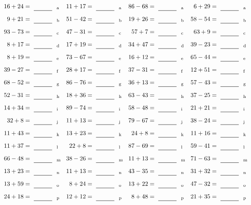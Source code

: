 \documentclass
[
  draft    = true,
  fontsize = 11pt,
  parskip  = half-
]
{scrartcl}
\begin{document}
\clearpage
\begin{align*}
    \pline{16+24}&=\rline{a}
  & \pline{11+17}&=\rline{a}
  & \pline{86-68}&=\rline{a}
  & \pline{6+29}&=\rline{a} \\[1ex]
    \pline{9+21}&=\rline{b}
  & \pline{51-42}&=\rline{b}
  & \pline{19+26}&=\rline{b}
  & \pline{58-54}&=\rline{b} \\[1ex]
    \pline{93-73}&=\rline{c}
  & \pline{47-31}&=\rline{c}
  & \pline{57+7}&=\rline{c}
  & \pline{63+9}&=\rline{c} \\[1ex]
    \pline{8+17}&=\rline{d}
  & \pline{17+19}&=\rline{d}
  & \pline{34+47}&=\rline{d}
  & \pline{39-23}&=\rline{d} \\[1ex]
    \pline{8+19}&=\rline{e}
  & \pline{73-67}&=\rline{e}
  & \pline{16+12}&=\rline{e}
  & \pline{65-44}&=\rline{e} \\[1ex]
    \pline{39-27}&=\rline{f}
  & \pline{28+17}&=\rline{f}
  & \pline{37-31}&=\rline{f}
  & \pline{12+51}&=\rline{f} \\[1ex]
    \pline{68-52}&=\rline{g}
  & \pline{86-76}&=\rline{g}
  & \pline{36+13}&=\rline{g}
  & \pline{57-43}&=\rline{g} \\[1ex]
    \pline{52-31}&=\rline{h}
  & \pline{18+36}&=\rline{h}
  & \pline{63-43}&=\rline{h}
  & \pline{37-25}&=\rline{h} \\[1ex]
    \pline{14+34}&=\rline{i}
  & \pline{89-74}&=\rline{i}
  & \pline{58-48}&=\rline{i}
  & \pline{21+21}&=\rline{i} \\[1ex]
    \pline{32+8}&=\rline{j}
  & \pline{11+13}&=\rline{j}
  & \pline{79-67}&=\rline{j}
  & \pline{38-24}&=\rline{j} \\[1ex]
    \pline{11+43}&=\rline{k}
  & \pline{13+23}&=\rline{k}
  & \pline{24+8}&=\rline{k}
  & \pline{11+16}&=\rline{k} \\[1ex]
    \pline{11+37}&=\rline{l}
  & \pline{22+8}&=\rline{l}
  & \pline{87-69}&=\rline{l}
  & \pline{59-41}&=\rline{l} \\[1ex]
    \pline{66-48}&=\rline{m}
  & \pline{38-26}&=\rline{m}
  & \pline{11+13}&=\rline{m}
  & \pline{71-63}&=\rline{m} \\[1ex]
    \pline{13+23}&=\rline{n}
  & \pline{11+13}&=\rline{n}
  & \pline{43-35}&=\rline{n}
  & \pline{31+32}&=\rline{n} \\[1ex]
    \pline{13+59}&=\rline{o}
  & \pline{8+24}&=\rline{o}
  & \pline{13+22}&=\rline{o}
  & \pline{47-32}&=\rline{o} \\[1ex]
    \pline{24+18}&=\rline{p}
  & \pline{12+12}&=\rline{p}
  & \pline{8+48}&=\rline{p}
  & \pline{21+35}&=\rline{p}
\end{align*}
\end{document}
